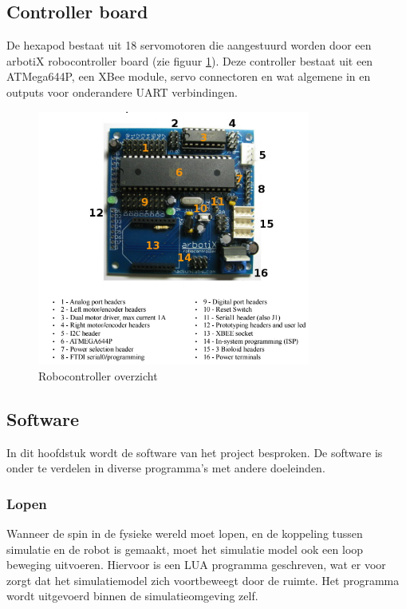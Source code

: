 \documentclass[10pt,a4paper]{article}
\begin{document}
\subsection{Controller board}
De hexapod bestaat uit 18 servomotoren die aangestuurd worden door een arbotiX robocontroller board (zie figuur \ref{fig:robocontroller-overview}). Deze controller bestaat uit een ATMega644P, een XBee module, servo connectoren en wat algemene in en outputs voor onderandere UART verbindingen.
\begin{figure}[h]
    \centering
    \includegraphics[width=0.8\textwidth]{robocontroller-overview.png}
    \caption{Robocontroller overzicht}
    \label{fig:robocontroller-overview}
\end{figure}


\newpage
\subsection{Software}
In dit hoofdstuk wordt de software van het project besproken. De software is onder te verdelen in diverse programma's met andere doeleinden.

\subsubsection{Lopen}
Wanneer de spin in de fysieke wereld moet lopen, en de koppeling tussen simulatie en de robot is gemaakt, moet het simulatie model ook een loop beweging uitvoeren. Hiervoor is een LUA programma geschreven, wat er voor zorgt dat het simulatiemodel zich voortbeweegt door de ruimte. Het programma wordt uitgevoerd binnen de simulatieomgeving zelf.
\end{document}
